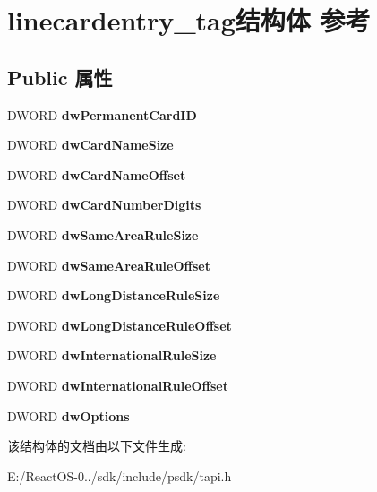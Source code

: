 \hypertarget{structlinecardentry__tag}{}\section{linecardentry\+\_\+tag结构体 参考}
\label{structlinecardentry__tag}
\subsection*{Public 属性}
\begin{DoxyCompactItemize}
\item 
\mbox{\label{structlinecardentry__tag_a2b20862eaa353b12a73789a811dd1451}} 
D\+W\+O\+RD {\bfseries dw\+Permanent\+Card\+ID}
\item 
\mbox{\label{structlinecardentry__tag_af88653d0dec82b4bf0bc372244c72d44}} 
D\+W\+O\+RD {\bfseries dw\+Card\+Name\+Size}
\item 
\mbox{\label{structlinecardentry__tag_ac3e60a1a8a6a35f99771f67ea0cff2b0}} 
D\+W\+O\+RD {\bfseries dw\+Card\+Name\+Offset}
\item 
\mbox{\label{structlinecardentry__tag_ac82f9e0296a42bbcae561cc9b0318425}} 
D\+W\+O\+RD {\bfseries dw\+Card\+Number\+Digits}
\item 
\mbox{\label{structlinecardentry__tag_a72adedfef993efab6b9b6bb803a7c5ef}} 
D\+W\+O\+RD {\bfseries dw\+Same\+Area\+Rule\+Size}
\item 
\mbox{\label{structlinecardentry__tag_a7cc82ed2056bea92a1987b8ed057a6e1}} 
D\+W\+O\+RD {\bfseries dw\+Same\+Area\+Rule\+Offset}
\item 
\mbox{\label{structlinecardentry__tag_a92ee4bafd34f78f527d972a2961a0b08}} 
D\+W\+O\+RD {\bfseries dw\+Long\+Distance\+Rule\+Size}
\item 
\mbox{\label{structlinecardentry__tag_a0297f3c2a640f9c1a033444772c3fc1a}} 
D\+W\+O\+RD {\bfseries dw\+Long\+Distance\+Rule\+Offset}
\item 
\mbox{\label{structlinecardentry__tag_ace1596058e45e1c31b8f98e9957467c8}} 
D\+W\+O\+RD {\bfseries dw\+International\+Rule\+Size}
\item 
\mbox{\label{structlinecardentry__tag_a9f0b47c2a171bb0b19c2c36e0f3146be}} 
D\+W\+O\+RD {\bfseries dw\+International\+Rule\+Offset}
\item 
\mbox{\label{structlinecardentry__tag_a986983cd7efcf7f7dbfa41e14d186c46}} 
D\+W\+O\+RD {\bfseries dw\+Options}
\end{DoxyCompactItemize}


该结构体的文档由以下文件生成\+:\begin{DoxyCompactItemize}
\item 
E\+:/\+React\+O\+S-\/0../sdk/include/psdk/tapi.\+h\end{DoxyCompactItemize}
